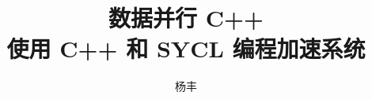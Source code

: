 \documentclass{ctexart}
\numberwithin{figure}{section}
\numberwithin{equation}{section}
\numberwithin{footnote}{section}
\numberwithin{table}{section}
\begin{document}
\title{数据并行 C++ \\ 使用 C++ 和 SYCL 编程加速系统}

\author{杨丰}
\date{}
\maketitle

\tableofcontents

\newpage


\newpage


\newpage


\newpage


\newpage


\newpage


\newpage


\newpage


\newpage


\newpage


\newpage


\newpage


\newpage


\newpage


\newpage


\newpage


\newpage


\newpage


\newpage


\newpage


\newpage


\newpage


\newpage


\newpage

\end{document}
